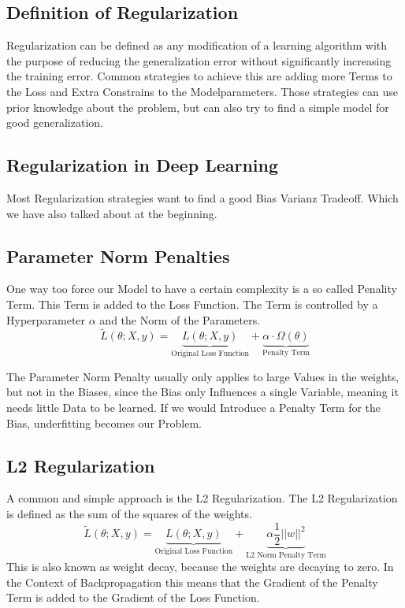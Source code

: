 \documentclass[a4paper]{article}
\begin{document}
\subsection{Definition of Regularization}
Regularization can be defined as any modification of a learning algorithm with the purpose of reducing the generalization error without significantly increasing the training error.
Common strategies to achieve this are adding more Terms to the Loss and Extra Constrains to the Modelparameters. Those strategies can use prior knowledge about the problem, but can also try to find a simple model for good generalization.
\subsection{Regularization in Deep Learning}
Most Regularization strategies want to find a good Bias Varianz Tradeoff. Which we have also talked about at the beginning. 

\subsection{Parameter Norm Penalties}
One way too force our Model to have a certain complexity is a so called Penality Term. This Term is added to the Loss Function. The Term is controlled by a Hyperparameter $\alpha$ and the Norm of the Parameters.   
\[
\tilde{L}(\theta; X, y) = \underbrace{L(\theta; X, y)}_{\text{Original Loss Function}} + \underbrace{\alpha \cdot \Omega(\theta)}_{\text{Penalty Term}}
\]

The Parameter Norm Penalty usually only applies to large Values in the weights, but not in the Biases, since the Bias only Influences a single Variable, meaning it needs little Data to be learned. If we would Introduce a Penalty Term for the Bias, underfitting becomes our Problem. 

\subsection{L2 Regularization}
A common and simple approach is the L2 Regularization. The L2 Regularization is defined as the sum of the squares of the weights. 
\[
\tilde{L}(\theta; X, y) = \underbrace{L(\theta; X, y)}_{\text{Original Loss Function}} + \underbrace{\alpha \frac{1}{2} ||w||^{2} }_{\text{L2 Norm Penalty Term}}
\]
This is also known as weight decay, because the weights are decaying to zero. In the Context of Backpropagation this means that the Gradient of the Penalty Term is added to the Gradient of the Loss Function. 
\end{document}
